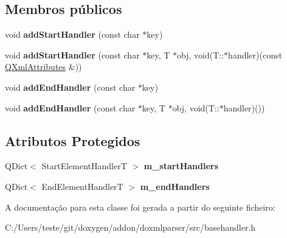 \subsection*{Membros públicos}
\begin{DoxyCompactItemize}
\item 
\hypertarget{class_element_mapper_a26e48b0ba4476d488c5069ab7e8ce19b}{void {\bfseries add\-Start\-Handler} (const char $\ast$key)}\label{class_element_mapper_a26e48b0ba4476d488c5069ab7e8ce19b}

\item 
\hypertarget{class_element_mapper_a6471194c02e11370340dac4b66bf576d}{void {\bfseries add\-Start\-Handler} (const char $\ast$key, T $\ast$obj, void(T\-::$\ast$handler)(const \hyperlink{class_q_xml_attributes}{Q\-Xml\-Attributes} \&))}\label{class_element_mapper_a6471194c02e11370340dac4b66bf576d}

\item 
\hypertarget{class_element_mapper_af13a53826c48920ddc1b4ba524668e94}{void {\bfseries add\-End\-Handler} (const char $\ast$key)}\label{class_element_mapper_af13a53826c48920ddc1b4ba524668e94}

\item 
\hypertarget{class_element_mapper_a5b3db543c1665575aed0a32080368364}{void {\bfseries add\-End\-Handler} (const char $\ast$key, T $\ast$obj, void(T\-::$\ast$handler)())}\label{class_element_mapper_a5b3db543c1665575aed0a32080368364}

\end{DoxyCompactItemize}
\subsection*{Atributos Protegidos}
\begin{DoxyCompactItemize}
\item 
\hypertarget{class_element_mapper_a5cafc3b674d0af64a5dc5f8343abd912}{Q\-Dict$<$ Start\-Element\-Handler\-T $>$ {\bfseries m\-\_\-start\-Handlers}}\label{class_element_mapper_a5cafc3b674d0af64a5dc5f8343abd912}

\item 
\hypertarget{class_element_mapper_ab2e4a3fe7d1cb4561350f7a1894038d9}{Q\-Dict$<$ End\-Element\-Handler\-T $>$ {\bfseries m\-\_\-end\-Handlers}}\label{class_element_mapper_ab2e4a3fe7d1cb4561350f7a1894038d9}

\end{DoxyCompactItemize}


A documentação para esta classe foi gerada a partir do seguinte ficheiro\-:\begin{DoxyCompactItemize}
\item 
C\-:/\-Users/teste/git/doxygen/addon/doxmlparser/src/basehandler.\-h\end{DoxyCompactItemize}

